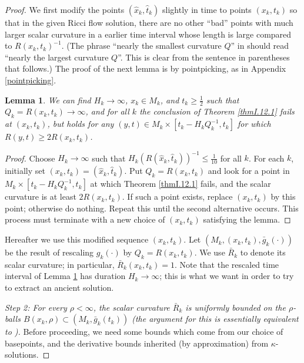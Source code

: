 \documentclass[12pt]{amsart}
\newcommand{\ra}{\rightarrow}
\numberwithin{equation}{section}
\theoremstyle{plain}
\newtheorem{lemma}[equation]{Lemma}
\theoremstyle{definition}
\theoremstyle{remark}
\begin{document}
\begin{proof}
We first modify the points 
$(\widehat{x}_k, \widehat{t}_k)$ slightly in time
to points $(x_k, t_k)$
so that in the given Ricci flow solution, there are no other ``bad'' points with
much larger scalar curvature in
a earlier time interval whose length is large compared to
$R(x_k, t_k)^{-1}$. 
(The phrase ``nearly the smallest curvature $Q$'' in 
\cite[Proof of Theorem 12.1]{Perelman} should read
``nearly the largest curvature $Q$''. This is clear from
the sentence in parentheses that follows.) The proof of
the next lemma is by pointpicking, as in Appendix \ref{pointpicking}. 

\begin{lemma}  \label{ptpicking}
We can find $H_k\ra\infty$, $x_k\in M_k$, and $t_k\geq\frac{1}{2}$
such that $Q_k =  R(x_k,t_k)\ra\infty$, and for all $k$
the conclusion of Theorem \ref{thmI.12.1} fails at $(x_k,t_k)$, 
but holds for
any $(y,t)\in M_k\times[t_k-H_kQ_k^{-1},t_k]$
for which $R(y,t)\geq 2R(x_k,t_k)$.
\end{lemma}
\begin{proof}
Choose $H_k\ra\infty$ such that 
$H_k(R(\widehat{x}_k,\widehat{t}_k))^{-1}\leq \frac{1}{10}$
for all $k$.  For each $k$, initially set $(x_k,t_k) = (\hat x_k,\hat t_k)$.
Put $Q_k = R(x_k, t_k)$ and look for a point in 
$M_k\times[t_k-H_kQ_k^{-1},t_k]$ at which 
Theorem \ref{thmI.12.1} fails,
and the scalar curvature is at least $2R(x_k,t_k)$. 
If such a point
exists, replace $(x_k,t_k)$  by this point; otherwise do nothing.
Repeat this until the second alternative occurs.
This process must terminate with a new choice of $(x_k,t_k)$
satisfying the lemma.
\end{proof}

Hereafter we use this modified sequence $(x_k, t_k)$. 
Let $(M_k,(x_k,t_k),\bar g_k(\cdot))$ be the result of rescaling $g_k(\cdot)$
by $Q_k=R(x_k,t_k)$. We use $\bar R_k$ to denote its scalar curvature;
in particular, $\bar R_k (x_k, t_k) = 1$.
Note that the rescaled time interval of Lemma \ref{ptpicking}
has duration $H_k \rightarrow \infty$;
this is what we want in order to try to extract an ancient solution.

\bigskip
{\em Step 2: For every $\rho<\infty$, the scalar curvature $\bar R_k$ 
is uniformly bounded 
on the $\rho$-balls $B(x_k,\rho)\subset (M_k,\bar g_k(t_k))$
(the argument for this is essentially equivalent to
\cite[Pf. of Claim 2 of Theorem I.12.1]{Perelman}).}
Before proceeding, we need some bounds which come from our choice
of basepoints, and the derivative bounds inherited (by approximation)
from $\kappa$-solutions.


\end{proof}
\end{document}
